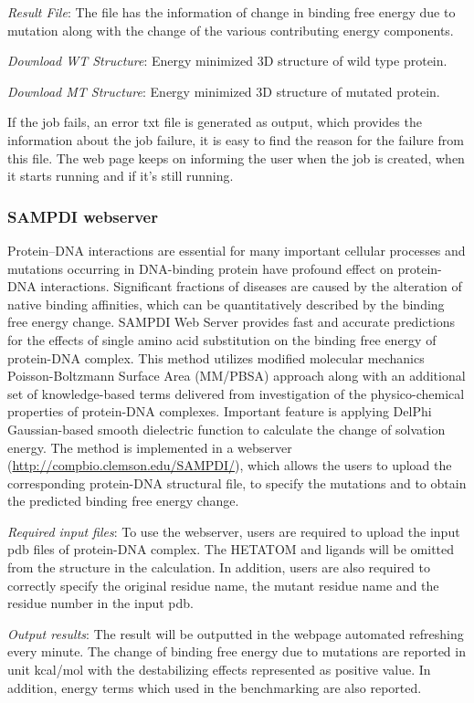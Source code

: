 \documentclass[9pt,tutorial]{livecoms}
\begin{document}
\textit{ Result File}: The file has the information of change in binding free energy due to mutation along with the change of the various contributing energy components.

\textit{Download WT Structure}: Energy minimized 3D structure of wild type protein.

\textit{Download MT Structure}: Energy minimized 3D structure of mutated protein.

If the job fails, an error txt file is generated as output, which provides the information about the job failure, it is easy to find the reason for the failure from this file. The web page keeps on informing the user when the job is created, when it starts running and if it’s still running.

\subsubsection{SAMPDI webserver}
Protein–DNA interactions are essential for many important cellular processes and mutations occurring in DNA-binding protein have profound effect on protein-DNA interactions. Significant fractions of diseases are caused by the alteration of native binding affinities, which can be quantitatively described by the binding free energy change. SAMPDI\cite{peng2017predicting} Web Server provides fast and accurate predictions for the effects of single amino acid substitution on the binding free energy of protein-DNA complex. This method utilizes modified molecular mechanics Poisson-Boltzmann Surface Area (MM/PBSA) approach along with an additional set of knowledge-based terms delivered from investigation of the physico-chemical properties of protein-DNA complexes. Important feature is applying DelPhi Gaussian-based smooth dielectric function to calculate the change of solvation energy. The method is implemented in a webserver (\url{http://compbio.clemson.edu/SAMPDI/}), which allows the users to upload the corresponding protein-DNA structural file, to specify the mutations and to obtain the predicted binding free energy change.

\textit{Required input files}: To use the webserver, users are required to upload the input pdb files of protein-DNA complex. The HETATOM and ligands will be omitted from the structure in the calculation. In addition, users are also required to correctly specify the original residue name, the mutant residue name and the residue number in the input pdb.

\textit{Output results}: The result will be outputted in the webpage automated refreshing every minute. The change of binding free energy due to mutations are reported in unit kcal/mol with the destabilizing effects represented as positive value. In addition, energy terms which used in the benchmarking are also reported. 
\end{document}
